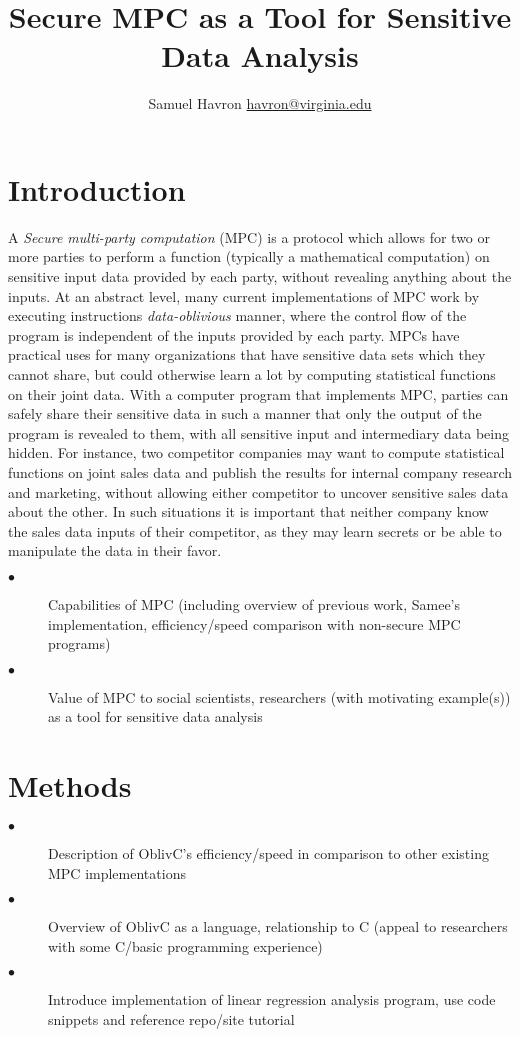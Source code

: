 \documentclass{article}
\author{Samuel Havron \textlangle{}\href{mailto:havron@virginia.edu}{havron@virginia.edu}\textrangle{}}
\title{\textbf{Secure MPC as a Tool for Sensitive Data Analysis}}
\begin{document}
\maketitle
\section{Introduction}
A \emph{Secure multi-party computation} (MPC) is a protocol which allows for two or more parties to perform a function (typically a mathematical computation) on sensitive input data provided by each party, without revealing anything about the inputs. At an abstract level, many current implementations of MPC work by executing instructions \emph{data-oblivious} manner, where the control flow of the program is independent of the inputs provided by each party. MPCs have practical uses for many organizations that have sensitive data sets which they cannot share, but could otherwise learn a lot by computing statistical functions on their joint data. With a computer program that implements MPC, parties can safely share their sensitive data in such a manner that only the output of the program is revealed to them, with all sensitive input and intermediary data being hidden. For instance, two competitor companies may want to compute statistical functions on joint sales data and publish the results for internal company research and marketing, without allowing either competitor to uncover sensitive sales data about the other. In such situations it is important that neither company know the sales data inputs of their competitor, as they may learn secrets or be able to manipulate the data in their favor.
\\
\begin{description}
\item[$\bullet$] Capabilities of MPC (including overview of previous work, Samee's implementation, efficiency/speed comparison with non-secure MPC programs) 
\item[$\bullet$] Value of MPC to social scientists, researchers (with motivating example(s)) as a tool for sensitive data analysis
\end{description}

\section{Methods}
\begin{description}
\item[$\bullet$] Description of OblivC’s efficiency/speed in comparison to other existing MPC implementations
\item[$\bullet$] Overview of OblivC as a language, relationship to C (appeal to researchers with some C/basic programming experience) 
\item[$\bullet$] Introduce implementation of linear regression analysis program, use code snippets and reference repo/site tutorial
\end{description}
\end{document}
